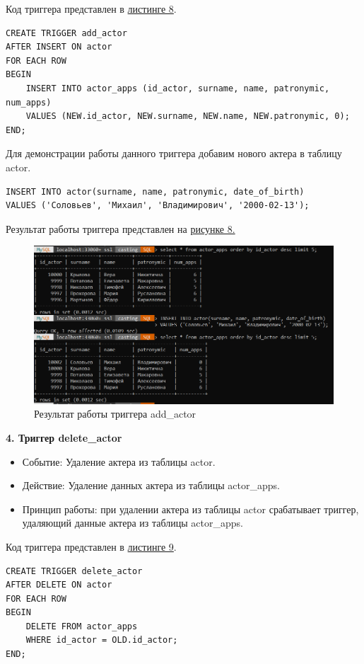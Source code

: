 \documentclass[11pt,a4paper,final]{article} %
\begin{document}
Код триггера представлен в \hyperref[lst:l8]{листинге 8}.

\begin{lstlisting}[caption={Код триггера add\_actor}, label=lst:l8]
CREATE TRIGGER add_actor
AFTER INSERT ON actor
FOR EACH ROW
BEGIN
	INSERT INTO actor_apps (id_actor, surname, name, patronymic, num_apps)
	VALUES (NEW.id_actor, NEW.surname, NEW.name, NEW.patronymic, 0);
END;
\end{lstlisting}


Для демонстрации работы данного триггера добавим нового актера в таблицу actor.

\begin{lstlisting}
INSERT INTO actor(surname, name, patronymic, date_of_birth) 
VALUES ('Соловьев', 'Михаил', 'Владимирович', '2000-02-13'); 
\end{lstlisting}


Результат работы триггера представлен на \hyperref[fig:pic8]{рисунке 8.}

\begin{figure}[H]
	\centering
	\includegraphics[width=0.9\linewidth]{pic8.png}
	\caption{Результат работы триггера add\_actor}
	\label{fig:pic8}
\end{figure}


\textbf{4. Триггер delete\_actor}
\begin{itemize}
	\item Событие: Удаление актера из таблицы actor.
	\item Действие: Удаление данных актера из таблицы actor\_apps.
	\item Принцип работы: при удалении актера из таблицы actor срабатывает триггер, удаляющий данные актера из таблицы actor\_apps.
\end{itemize}

Код триггера представлен в \hyperref[lst:l9]{листинге 9}.

\begin{lstlisting}[caption={Код триггера delete\_actor}, label=lst:l9]
CREATE TRIGGER delete_actor
AFTER DELETE ON actor
FOR EACH ROW
BEGIN
	DELETE FROM actor_apps
	WHERE id_actor = OLD.id_actor;
END;
\end{lstlisting}
\end{document}
